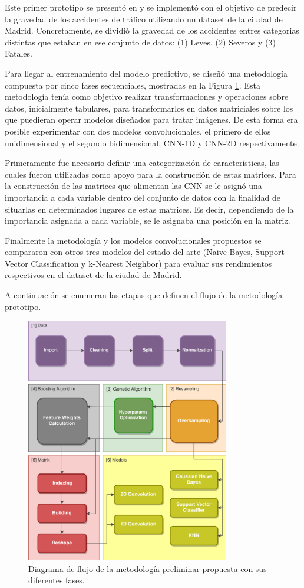\documentclass{uathesis-es}
\begin{document}
Este primer prototipo se presentó en \cite{PEREZSALA2023113245} y se implementó con el objetivo de predecir la gravedad de los accidentes de tráfico utilizando un dataset de la ciudad de Madrid. Concretamente, se dividió la gravedad de los accidentes entres categorias distintas que estaban en ese conjunto de datos: (1) Leves, (2) Severos y (3) Fatales.

Para llegar al entrenamiento del modelo predictivo, se diseñó una metodología compuesta por cinco fases secuenciales, mostradas en la Figura \ref{figDegree}. Esta metodología tenía como objetivo realizar transformaciones y operaciones sobre datos, inicialmente tabulares, para transformarlos en datos matriciales sobre los que puedieran operar modelos diseñados para tratar imágenes. De esta forma era posible experimentar con dos modelos convolucionales, el primero de ellos unidimensional y el segundo bidimensional, CNN-1D y CNN-2D respectivamente.

Primeramente fue necesario definir una categorización de características, las cuales fueron utilizadas como apoyo para la construcción de estas matrices. Para la construcción de las matrices que alimentan las CNN se le asignó una importancia a cada variable dentro del conjunto de datos con la finalidad de situarlas en determinados lugares de estas matrices. Es decir, dependiendo de la importancia asignada a cada variable, se le asignaba una posición en la matriz. 

Finalmente la metodología y los modelos convolucionales propuestos se compararon con otros tres modelos del estado del arte (Naive Bayes, Support Vector Classification y k-Nearest Neighbor) para evaluar sus rendimientos respectivos en el dataset de la ciudad de Madrid.

A continuación se enumeran las etapas que definen el flujo de la metodología prototipo.

\begin{figure}[H]
    \centering
    \includegraphics[width=3.5in]{Figures/1stPaper/Data_flow.png}
    \caption{Diagrama de flujo de la metodología preliminar propuesta con sus diferentes fases.}
    \label{figDegree}
\end{figure}
\end{document}
